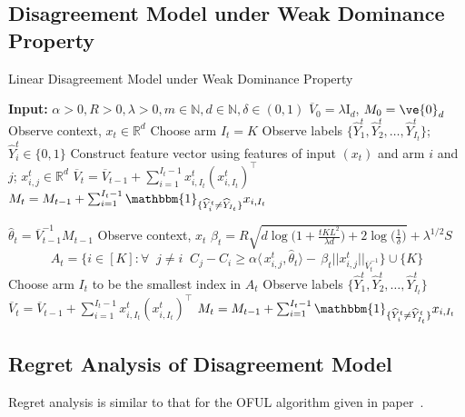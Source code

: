 \subsection{Disagreement Model under Weak Dominance Property}
\begin{algorithm}[H]
	\caption{Linear Disagreement Model under Weak Dominance Property}
	\label{algo:linDM}
	\begin{algorithmic}[1]
		\State \textbf{Input:} $\alpha > 0, R > 0, \lambda > 0, m \in \mathbb{N}, d \in \mathbb{N}, \delta \in (0,1)$
		\State $\overline{V}_0 = \lambda \mathrm{I}_d$, $M_0 = \ve{0}_d$ 
		\State Observe context, $x_t \in \mathbb{R}^d$
		\State Choose arm $I_t = K$
		\State Observe labels $\{\widehat{Y}_1^t, \widehat{Y}_2^t, \ldots, \widehat{Y}_{I_t}^t \}$; $\widehat{Y}_i^t \in \{0, 1\}$
		\State Construct feature vector using features of input $(x_t)$ and arm $i$ and $j$; $x_{i, j}^t \in \mathbb{R}^d$
		\State $\overline{V}_t = \overline{V}_{t-1} + \sum_{i=1}^{I_t-1}x_{i, I_t}^t (x_{i, I_t}^t)^\top$
		\State $M_t = M_{t-1} + \sum_{i=1}^{I_t-1}\mathbbm{1}_{\{\widehat{Y}_i^t \neq \widehat{Y}_{I_t}\}}x_{i, I_t}$ 
		\EndFor
		
		\For{$t=m+1, m+2, \ldots$}
		\State $\widehat{\theta}_t = \overline{V}_{t-1}^{-1}M_{t-1}$
		\State Observe context, $x_t$
		\State $\beta_t = R\sqrt{d\log\bigg(1 + \frac{tKL^2}{\lambda d}\bigg) + 2\log\bigg(\frac{1}{\delta}\bigg)} + \lambda^{1/2}S$
		\State \begin{equation}
		\label{eqn:SelectionCriteria}
		A_t= \{i \in [K]: \forall \;\; j \neq i  \;\;  C_j - C_i \geq \alpha\langle\,x_{i, j}^t, \widehat{\theta}_t\rangle -\, \beta_t ||x_{i,j}^t||_{\overline{V}_t^{-1}} \}\cup\{K\}
			\end{equation}
		\State Choose arm $I_t$ to be the smallest index in $A_t$
		\State Observe labels $\{\widehat{Y}_1^t, \widehat{Y}_2^t, \ldots, \widehat{Y}_{I_t}^t \}$
		\State $\overline{V}_t = \overline{V}_{t-1} + \sum_{i=1}^{I_t-1}x_{i, I_t}^t (x_{i, I_t}^t)^\top$
		\State $M_t = M_{t-1} + \sum_{i=1}^{I_t-1}\mathbbm{1}_{\{\widehat{Y}_i^t \neq \widehat{Y}_{I_t}^t\}}x_{i, I_t}$
		\EndFor
		
	\end{algorithmic}
\end{algorithm}

\subsection{Regret Analysis of Disagreement Model}
\label{sec:dma_regret}
Regret analysis is similar to that for the OFUL algorithm given in paper~\cite{abbasi2011improved}.

